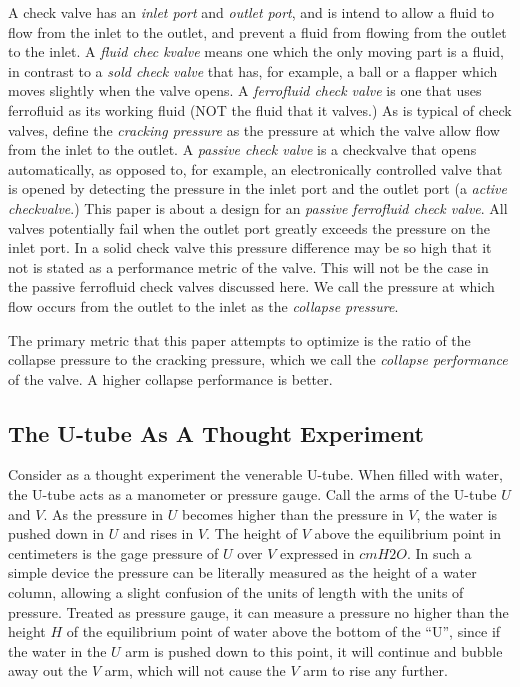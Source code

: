\documentclass{asme2ej}
\begin{document}
A check valve has an {\em inlet port} and {\em outlet port}, and is intend to
allow a fluid to flow from the inlet to the outlet, and prevent a fluid from
flowing from the outlet to the inlet.
A {\em fluid chec kvalve} means one which the only moving part is a fluid, in
contrast to a {\em sold check valve} that has, for example, a ball or a flapper
which moves slightly when the valve opens. A {\em ferrofluid check valve} is one
that uses ferrofluid as its working fluid (NOT the fluid that it valves.)
As is typical of check valves, define the {\em cracking pressure} as the
pressure at which the valve allow flow from the inlet to the outlet.
A {\em passive check valve} is a checkvalve that opens automatically,
as opposed to, for example,  an electronically controlled valve that is
opened by detecting the pressure in the inlet port and the outlet port (a {\em active checkvalve}.)
This paper is about a design for an {\em passive ferrofluid check valve}.
All valves potentially fail when the outlet port greatly exceeds the pressure
on the inlet port. In a solid check valve this pressure difference may be
so high that it not is stated as a performance metric of the valve. This will
not be the case in the passive ferrofluid check valves discussed here.
We call the pressure at which flow occurs from the outlet to the inlet as
the {\em collapse pressure}.

The primary metric that this paper attempts to optimize is the ratio of the
collapse pressure to the cracking pressure, which we call the {\em collapse performance}
of the valve. A higher collapse performance is better.

\subsection{The U-tube As A Thought Experiment}

Consider as a thought experiment the venerable U-tube. When filled with water,
the U-tube acts as a manometer or pressure gauge. Call the arms of the U-tube
$U$ and $V$. As the pressure in $U$ becomes higher than the pressure in $V$,
the water is pushed down in $U$ and rises in $V$. The height of $V$ above
the equilibrium point in centimeters is the gage pressure of $U$ over $V$
expressed in $cmH2O$. In such a simple device the pressure can be literally
measured as the height of a water column, allowing a slight confusion
of the units of length with the units of pressure.
Treated as pressure gauge, it can measure a pressure
no higher than the height $H$ of the equilibrium point of water above the
bottom of the ``U'', since if the water in the $U$ arm is pushed down
to this point, it will continue and bubble away out the $V$ arm, which
will not cause the $V$ arm to rise any further.
\end{document}

